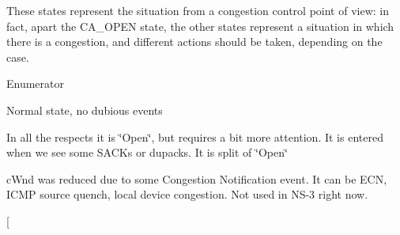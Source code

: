 These states represent the situation from a congestion control point of view\+: in fact, apart the C\+A\+\_\+\+O\+P\+EN state, the other states represent a situation in which there is a congestion, and different actions should be taken, depending on the case. \begin{Desc}
\item[Enumerator]\par
\begin{description}
\item[{\em 
C\+A\+\_\+\+O\+P\+EN\hypertarget{classns3_1_1TcpSocketState_a6fc313945a33d48fd60cbffe0c787b19af2d22f02a77b603394c34d4968bad142}{}\label{classns3_1_1TcpSocketState_a6fc313945a33d48fd60cbffe0c787b19af2d22f02a77b603394c34d4968bad142}
}]Normal state, no dubious events \item[{\em 
C\+A\+\_\+\+D\+I\+S\+O\+R\+D\+ER\hypertarget{classns3_1_1TcpSocketState_a6fc313945a33d48fd60cbffe0c787b19a389f9d267c6b0a752d39a0d1a9ee3aae}{}\label{classns3_1_1TcpSocketState_a6fc313945a33d48fd60cbffe0c787b19a389f9d267c6b0a752d39a0d1a9ee3aae}
}]In all the respects it is \char`\"{}\+Open\char`\"{}, but requires a bit more attention. It is entered when we see some S\+A\+C\+Ks or dupacks. It is split of \char`\"{}\+Open\char`\"{} \item[{\em 
C\+A\+\_\+\+C\+WR\hypertarget{classns3_1_1TcpSocketState_a6fc313945a33d48fd60cbffe0c787b19a67d118544a382f82f0429906b5f5f94f}{}\label{classns3_1_1TcpSocketState_a6fc313945a33d48fd60cbffe0c787b19a67d118544a382f82f0429906b5f5f94f}
}]c\+Wnd was reduced due to some Congestion Notification event. It can be E\+CN, I\+C\+MP source quench, local device congestion. Not used in N\+S-\/3 right now. \item[{\em 
}
\end{description}
\end{Desc}
